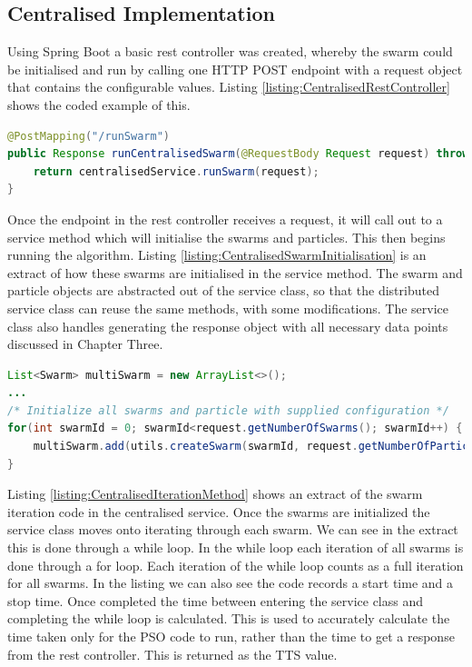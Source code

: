 \documentclass[oneside,12pt]{book}
\begin{document}
\subsection{Centralised Implementation}
Using Spring Boot a basic rest controller was created, whereby the swarm could be initialised and run by calling one HTTP POST endpoint with a request object that contains the configurable values. Listing \ref{listing:CentralisedRestController} shows the coded example of this. 
\begin{lstlisting}[basicstyle=\footnotesize, language=Java]
@PostMapping("/runSwarm")
public Response runCentralisedSwarm(@RequestBody Request request) throws Exception {
    return centralisedService.runSwarm(request);
}
\end{lstlisting}
\label{listing:CentralisedRestController}

Once the endpoint in the rest controller receives a request, it will call out to a service method which will initialise the swarms and particles. This then begins running the algorithm. Listing \ref{listing:CentralisedSwarmInitialisation} is an extract of how these swarms are initialised in the service method. The swarm and particle objects are abstracted out of the service class, so that the distributed service class can reuse the same methods, with some modifications. The service class also handles generating the response object with all necessary data points discussed in Chapter Three. 

\begin{lstlisting}[basicstyle=\footnotesize, language=Java]
List<Swarm> multiSwarm = new ArrayList<>();
...
/* Initialize all swarms and particle with supplied configuration */
for(int swarmId = 0; swarmId<request.getNumberOfSwarms(); swarmId++) {
    multiSwarm.add(utils.createSwarm(swarmId, request.getNumberOfParticles(), request.getConfigVariables()));
}
\end{lstlisting}
\label{listing:CentralisedSwarmInitialisation}

Listing \ref{listing:CentralisedIterationMethod} shows an extract of the swarm iteration code in the centralised service. Once the swarms are initialized the service class moves onto iterating through each swarm. We can see in the extract this is done through a while loop. In the while loop each iteration of all swarms is done through a for loop. Each iteration of the while loop counts as a full iteration for all swarms. In the listing we can also see the code records a start time and a stop time. Once completed the time between entering the service class and completing the while loop is calculated. This is used to accurately calculate the time taken only for the PSO code to run, rather than the time to get a response from the rest controller. This is returned as the TTS value. 
\end{document}
